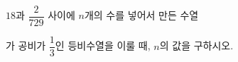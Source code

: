 $18$과 $\dfrac{2}{729}$ 사이에 $n$개의 수를 넣어서 만든 수열 \par\smallskip{}\par\smallskip\noindent 가 공비가 $\dfrac{1}{3}$인 등비수열을 이룰 때, $n$의 값을 구하시오.
